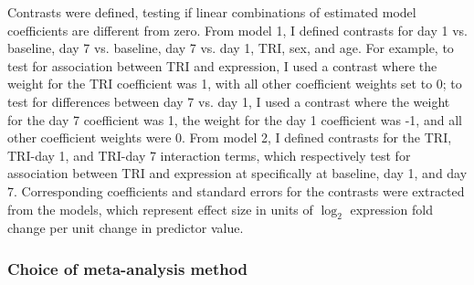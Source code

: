 Contrasts were defined, testing if linear combinations of estimated model coefficients are different from zero.
%
From model 1, I defined contrasts for day 1 vs. baseline, day 7 vs. baseline, day 7 vs. day 1, \gls{TRI}, sex, and age.
For example, 
to test for association between \gls{TRI} and expression, 
    I used a contrast where
    the weight for the \gls{TRI} coefficient was 1,
    with all other coefficient weights set to 0;
to test for differences between day 7 vs. day 1,
    I used a contrast where
    the weight for the day 7 coefficient was 1,
    the weight for the day 1 coefficient was -1,
    and all other coefficient weights were 0.
From model 2, I defined contrasts for the \gls{TRI}, \gls{TRI}-day 1, and \gls{TRI}-day 7 interaction terms,
    which respectively test for association between \gls{TRI} and expression at specifically at baseline, day 1, and day 7.
%
Corresponding coefficients and standard errors for the contrasts were extracted from the  models, 
which represent effect size in units of $\log_2$ expression fold change per unit change in predictor value.

\subsubsection{Choice of  meta-analysis method}
\label{subsubsec:hird_dge_meta_methodChoice}

